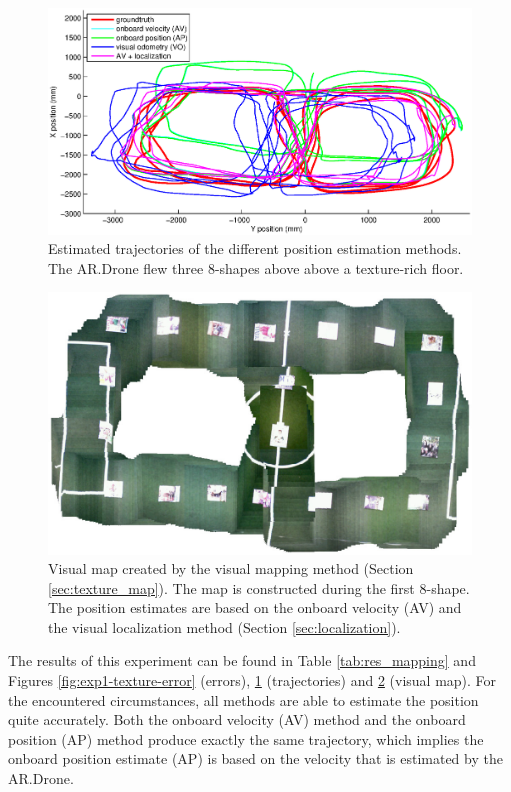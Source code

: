 \begin{figure}[htb!]
\centering
\includegraphics[width=\linewidth]{images/exp1-run13-path.eps}
\caption{Estimated trajectories of the different position estimation methods. The AR.Drone flew three 8-shapes above above a texture-rich floor.}
\label{fig:exp1-texture-path}
\end{figure}

\begin{figure}[htb!]
\centering
\includegraphics[width=0.75\linewidth]{images/exp1-run13-map.jpg}
\caption{Visual map created by the visual mapping method (Section \ref{sec:texture_map}). The map is constructed during the first 8-shape. The position estimates are based on the onboard velocity (AV) and the visual localization method (Section \ref{sec:localization}).}
\label{fig:exp1-texture-map}
\end{figure}

The results of this experiment can be found in Table \ref{tab:res_mapping} and Figures \ref{fig:exp1-texture-error} (errors), \ref{fig:exp1-texture-path} (trajectories) and \ref{fig:exp1-texture-map} (visual map).
For the encountered circumstances, all methods are able to estimate the position quite accurately.
Both the onboard velocity (AV) method and the onboard position (AP) method produce exactly the same trajectory, which implies the onboard position estimate (AP) is based on the velocity that is estimated by the AR.Drone.

